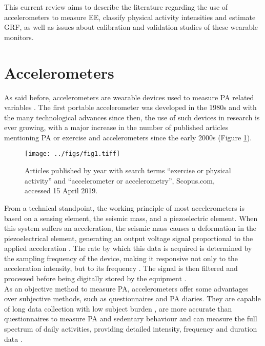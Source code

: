 \documentclass[11pt]{article}
\begin{document}
This current review aims to describe the literature regarding the use of accelerometers to measure EE, classify physical activity intensities and estimate GRF, as well as issues about calibration and validation studies of these wearable monitors. 

\section*{Accelerometers}

As said before, accelerometers are wearable devices used to measure PA related variables \cite{Chen_2005}. The first portable accelerometer was developed in the 1980s \cite{Wong_1981, Montoye_1983} and with the many technological advances since then, the use of such devices in research is ever growing, with a major increase in the number of published articles mentioning PA or exercise and accelerometers since the early 2000s (Figure \ref{art_year}).

\begin{figure}[h!]
	\texttt{[image: ../figs/fig1.tiff]}
	\caption{Articles published by year with search terms ``exercise or physical activity'' and ``accelerometer or accelerometry'', Scopus.com, accessed 15 April 2019.}
	\label{art_year}
\end{figure}

From a technical standpoint, the working principle of most accelerometers is based on a sensing element, the seismic mass, and a piezoelectric element. When this system suffers an acceleration, the seismic mass causes a deformation in the piezoelectrical element, generating an output voltage signal proportional to the applied acceleration \cite{Chen_2005, Yang_2010}. The rate by which this data is acquired is determined by the sampling frequency of the device, making it responsive not only to the acceleration intensity, but to its frequency \cite{Mathie_2004}. The signal is then filtered and processed before being digitally stored by the equipment \cite{Chen_2005}. \\

As an objective method to measure PA, accelerometers offer some advantages over subjective methods, such as questionnaires and PA diaries. They are capable of long data collection with low subject burden \cite{Chen_2012, Strath_2013}, are more accurate than questionnaires to measure PA and sedentary behaviour \cite{Celis-Morales_2012, Matthews_2018} and can measure the full spectrum of daily activities, providing detailed intensity, frequency and duration data \cite{Matthews_2018, Strath_2013}. \\
\end{document}
